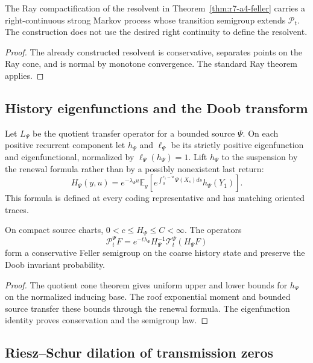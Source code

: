 \begin{corollary}
\label{cor:r7-a4-ray}
The Ray compactification of the resolvent in
Theorem~\ref{thm:r7-a4-feller} carries a right-continuous strong Markov process
whose transition semigroup extends $\mathcal P_t$.  The construction does not
use the desired right continuity to define the resolvent.
\end{corollary}

\begin{proof}
The already constructed resolvent is conservative, separates points on the Ray
cone, and is normal by monotone convergence.  The standard Ray theorem applies.
\end{proof}

\subsection{History eigenfunctions and the Doob transform}

Let $L_\Psi$ be the quotient transfer operator for a bounded source $\Psi$.
On each positive recurrent component let $h_\Psi$ and $\ell_\Psi$ be its
strictly positive eigenfunction and eigenfunctional, normalized by
$\ell_\Psi(h_\Psi)=1$.  Lift $h_\Psi$ to the suspension by the renewal formula
rather than by a possibly nonexistent last return:
\[
 H_\Psi(y,u)=e^{-\lambda_\Psi u}
 \mathbb E_y\left[
 e^{\int_0^{\tau_1-u}\Psi(X_s)ds}
 h_\Psi(Y_1)
 \right].
\]
This formula is defined at every coding representative and has matching
oriented traces.

\begin{theorem}
\label{thm:r7-a4-doob}
On compact source charts,
$0<c\le H_\Psi\le C<\infty$.  The operators
\[
 \mathcal P_t^\Psi F
 =e^{-t\lambda_\Psi}H_\Psi^{-1}
 \mathcal T_t^\Psi(H_\Psi F)
\]
form a conservative Feller semigroup on the coarse history state and preserve
the Doob invariant probability.
\end{theorem}

\begin{proof}
The quotient cone theorem gives uniform upper and lower bounds for
$h_\Psi$ on the normalized inducing base.  The roof exponential moment and
bounded source transfer these bounds through the renewal formula.  The
eigenfunction identity proves conservation and the semigroup law.
\end{proof}

\subsection{Riesz--Schur dilation of transmission zeros}

